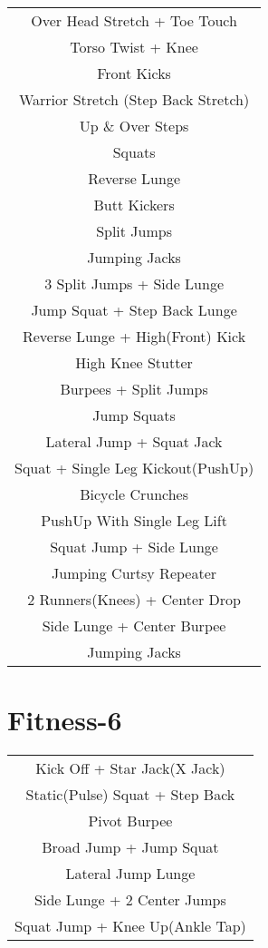 \documentclass[12pt]{article}
\newcommand\myPadding{1.5}
\begin{document}
\begin{center}
  \bgroup
  \def\arraystretch{\myPadding}%
  \begin{tabular}{ c  }
Over Head Stretch + Toe Touch
\\
Torso Twist + Knee
\\
Front Kicks
\\
Warrior Stretch (Step Back Stretch)
\\
Up \& Over Steps
\\
Squats
\\
Reverse Lunge
\\
Butt Kickers
\\
Split Jumps
\\
Jumping Jacks
\\
3 Split Jumps + Side Lunge
\\
Jump Squat + Step Back Lunge
\\
Reverse Lunge + High(Front) Kick
\\
High Knee Stutter
\\
Burpees + Split Jumps
\\
Jump Squats
\\
Lateral Jump + Squat Jack
\\
Squat + Single Leg Kickout(PushUp)
\\
Bicycle Crunches
\\
PushUp With Single Leg Lift
\\
Squat Jump + Side Lunge
\\
Jumping Curtsy Repeater
\\
2 Runners(Knees) + Center Drop
\\
Side Lunge + Center Burpee
\\
Jumping Jacks
  \end{tabular}
  \egroup
\end{center}








\section{Fitness-6}





\begin{center}
  \bgroup
  \def\arraystretch{\myPadding}%
  \begin{tabular}{ c  }
Kick Off + Star Jack(X Jack)
\\
Static(Pulse) Squat + Step Back
\\
Pivot Burpee
\\
Broad Jump + Jump Squat
\\
Lateral Jump Lunge
\\
Side Lunge + 2 Center Jumps
\\
Squat Jump + Knee Up(Ankle Tap)
  \end{tabular}
  \egroup
\end{center}
\end{document}
